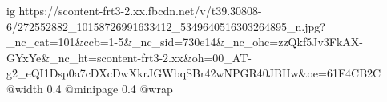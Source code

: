 
 
 
 
 

\ifcmt
  ig https://scontent-frt3-2.xx.fbcdn.net/v/t39.30808-6/272552882_10158726991633412_5349640516303264895_n.jpg?_nc_cat=101&ccb=1-5&_nc_sid=730e14&_nc_ohc=zzQkf5Jv3FkAX-GYxYe&_nc_ht=scontent-frt3-2.xx&oh=00_AT-g2_eQI1Dsp0a7cDXcDwXkrJGWbqSBr42wNPGR40JBHw&oe=61F4CB2C
  @width 0.4
  @minipage 0.4
  @wrap \parpic[r]
\fi
